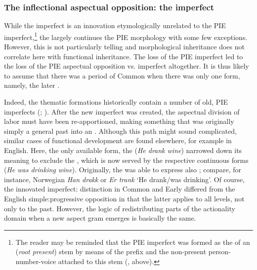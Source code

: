 \documentclass[output=paper]{langsci/langscibook}
\begin{document}
\subsubsection{The inflectional aspectual opposition: the imperfect}\label{sec:wiemerserzant:3.2.4}

While the  imperfect is an innovation etymologically unrelated to the PIE imperfect,\footnote{The reader may be reminded that the PIE imperfect was formed as the  of an  (\textit{root present}) stem by means of the  prefix and the non-present person-number-voice attached to this stem (,  above).} the   largely continues the PIE  morphology with some few exceptions. However, this is not particularly telling and morphological inheritance does not correlate here with functional inheritance. The loss of the PIE imperfect led to the loss of the PIE aspectual opposition  vs. imperfect altogether. It is thus likely to assume that there was a period of Common  when there was only one  form, namely, the later  \citep[21]{Andersen2013}.

Indeed, the thematic  formations historically contain a number of old, PIE imperfects (\citealt[195]{Leskien1919}; \citealt[352]{Pohl1971}). After the new  imperfect was created, the aspectual division of labor must have been re-apportioned, making something that was originally simply a general past \citep{Forsyth1972} into an . Although this path might sound complicated, similar cases of functional development are found elsewhere, for example in English. Here, the only available form, the  (\textit{He drank wine}) narrowed down its meaning to exclude the , which is now served by the respective continuous forms (\textit{He was drinking wine}). Originally, the  was able to express also ; compare, for instance, Norwegian \textit{Han drakk} or  \textit{Er trank} ‘He drank/was drinking’. Of course, the innovated imperfect: distinction in Common and Early  differed from the English simple:progressive opposition in that the latter applies to all  levels, not only to the past. However, the logic of redistributing parts of the actionality domain when a new aspect gram emerges is basically the same.
\end{document}
